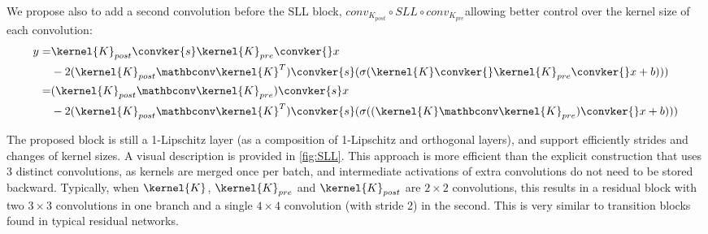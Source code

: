     We propose also to add a second convolution before the SLL block, $conv_{K_{post}}\circ SLL\circ conv_{K_{pre}}$allowing better control over the kernel size of each convolution:
    \begin{align*}
        y = &\kernel{K}_{post} \convker{s} \kernel{K}_{pre} \convker{} x \\
        & - 2(\kernel{K}_{post} \mathbconv \kernel{K}^T) \convker{s} ( \sigma ( \kernel{K} \convker{} \kernel{K}_{pre} \convker{} x + b ))) \\
        = &(\kernel{K}_{post} \mathbconv \kernel{K}_{pre}) \convker{s} x \\
        & - 2(\kernel{K}_{post} \mathbconv \kernel{K}^T) \convker{s} ( \sigma ( (\kernel{K} \mathbconv \kernel{K}_{pre}) \convker{} x + b ))) \\
    \end{align*}
    
    The proposed block is still a 1-Lipschitz layer (as a composition of 1-Lipschitz and orthogonal layers), and support efficiently strides and changes of kernel sizes.
    A visual description is provided in \cref{fig:SLL}. This approach is more efficient than the explicit construction that uses 3 distinct convolutions, as kernels are merged once per batch, and intermediate activations of extra convolutions do not need to be stored backward. Typically, when $\kernel{K}$, $\kernel{K}_{pre}$ and $\kernel{K}_{post}$ are $2 \times 2$ convolutions, this results in a residual block with two $3 \times 3$ convolutions in one branch and a single $4 \times 4$ convolution (with stride 2) in the second. This is very similar to transition blocks found in typical residual networks.


